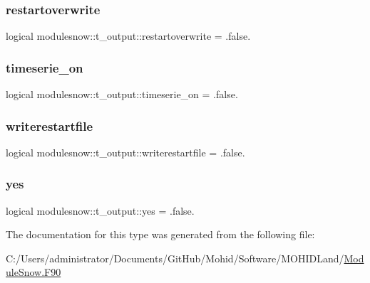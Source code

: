 \subsubsection{\texorpdfstring{restartoverwrite}{restartoverwrite}}
{\footnotesize\ttfamily logical modulesnow\+::t\+\_\+output\+::restartoverwrite = .false.\hspace{0.3cm}{\ttfamily [private]}}

\mbox{\label{structmodulesnow_1_1t__output_af562aad92f3a12982f7a9abbd7e8cdad}} 
\subsubsection{\texorpdfstring{timeserie\+\_\+on}{timeserie\_on}}
{\footnotesize\ttfamily logical modulesnow\+::t\+\_\+output\+::timeserie\+\_\+on = .false.\hspace{0.3cm}{\ttfamily [private]}}

\mbox{\label{structmodulesnow_1_1t__output_a3ff115e0e147fb37d1fd96a6b6d45c1e}} 
\subsubsection{\texorpdfstring{writerestartfile}{writerestartfile}}
{\footnotesize\ttfamily logical modulesnow\+::t\+\_\+output\+::writerestartfile = .false.\hspace{0.3cm}{\ttfamily [private]}}

\mbox{\label{structmodulesnow_1_1t__output_ac636a0dc496fc5873415c6c190b765a2}} 
\subsubsection{\texorpdfstring{yes}{yes}}
{\footnotesize\ttfamily logical modulesnow\+::t\+\_\+output\+::yes = .false.\hspace{0.3cm}{\ttfamily [private]}}



The documentation for this type was generated from the following file\+:\begin{DoxyCompactItemize}
\item 
C\+:/\+Users/administrator/\+Documents/\+Git\+Hub/\+Mohid/\+Software/\+M\+O\+H\+I\+D\+Land/\mbox{\hyperlink{_module_snow_8_f90}{Module\+Snow.\+F90}}\end{DoxyCompactItemize}
